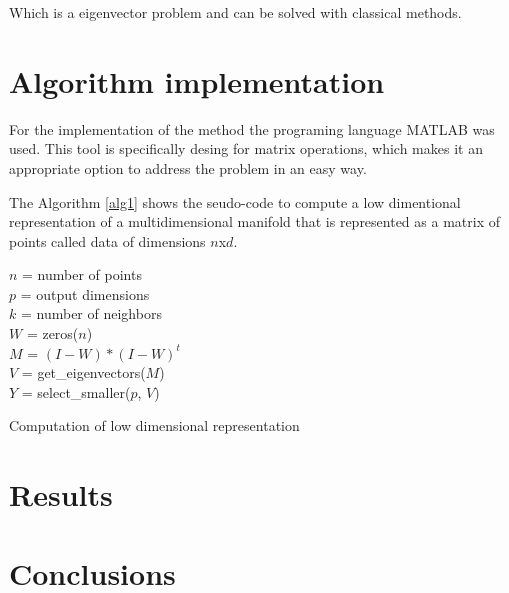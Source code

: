 \documentclass[12pt,journal]{IEEEtran}
\begin{document}
    Which is a eigenvector problem and can be solved with classical methods. 

\section{Algorithm implementation}

For the implementation of the method the programing language MATLAB \cite{matlab}
was used. This tool is specifically desing for matrix operations, which makes it
an appropriate option to address the problem in an easy way.

\vspace{0.25cm}

The Algorithm \ref{alg1} shows the seudo-code to compute a low
dimentional representation of a multidimensional manifold that is represented as
a matrix of points called data of dimensions $n$x$d$.

\begin{algorithm}
    $n$ = number of points\\
    $p$ = output dimensions\\
    $k$ = number of neighbors\\
    \vspace{0.5cm}
    $W$ = zeros($n$)\\
    \vspace{0.5cm}
    $M$ = $(I-W) * (I-W)^t$\\
    $V$ = get\_eigenvectors($M$)\\
    $Y$ = select\_smaller($p$, $V$)

    \vspace{0.5cm}

    \caption{Computation of low dimensional representation}
    \label{alg1}
\end{algorithm}

\section{Results}

\section{Conclusions}



\end{document}
